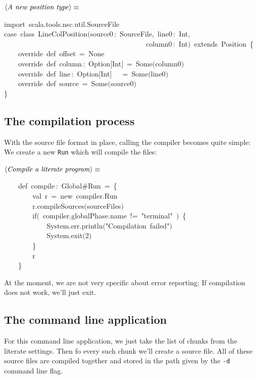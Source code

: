 \documentclass[a4paper,12pt]{article}
\begin{document}
$\left<\mbox{\emph{A new position type}}\right>\equiv$
\begin{program}{\vem import}~scala.tools.nsc.util.SourceFile
\\{\vem case}~{\vem class}~LineColPosition$($source0\,{\rm :}~SourceFile,~line0\,{\rm :}~Int,
\\~~~~~~~~~~~~~~~~~~~~~~~~~~~~~~~~~~~~~~~~column0\,{\rm :}~Int$)$~{\vem extends}~Position~{\small\{}
\\~~~~{\vem override}~{\vem def}~offset~=~None
\\~~~~{\vem override}~{\vem def}~column\,{\rm :}~Option$[$Int$]$~=~Some$($column0$)$
\\~~~~{\vem override}~{\vem def}~line\,{\rm :}~Option$[$Int$]$~~~=~Some$($line0$)$
\\~~~~{\vem override}~{\vem def}~source~=~Some$($source0$)$
\\{\small\}}
\\[0.5em]\end{program}
\subsection{The compilation process}
With the source file format in place, calling the compiler becomes quite
simple: We create a new \texttt{Run} which will compile the files:

$\left<\mbox{\emph{Compile a literate program}}\right>\equiv$
\begin{program}~~~~{\vem def}~compile\,{\rm :}~Global\#Run~=~{\small\{}
\\~~~~~~~~{\vem val}~r~=~{\vem new}~compiler.Run
\\[0.5em]~~~~~~~~r.compileSources$($sourceFiles$)$
\\~~~~~~~~{\vem if}$($~compiler.globalPhase.name~!=~"terminal"~$)$~{\small\{}
\\~~~~~~~~~~~~System.err.println$($"Compilation~failed"$)$
\\~~~~~~~~~~~~System.exit$($2$)$
\\~~~~~~~~{\small\}}
\\[0.5em]~~~~~~~~r
\\~~~~{\small\}}
\\[0.5em]\end{program}
At the moment, we are not very specific about error reporting: If
compilation does not work, we'll just exit.

\subsection{The command line application}
For this command line application, we just take the list of
chunks from the literate settings. Then fo every such chunk
we'll create a source file. All of these source files are
compiled together and stored in the path given by the \texttt{-d}
command line flag.
\end{document}
